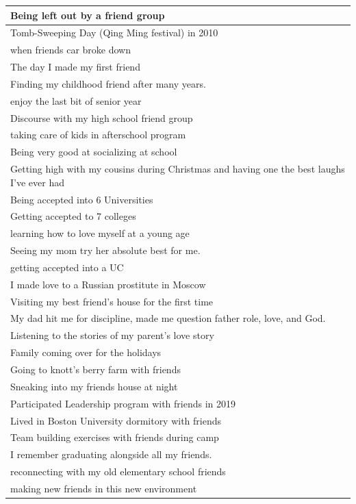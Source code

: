 \documentclass[
  .7em,
  letterpaper,
  DIV=11,
  numbers=noendperiod]{scrartcl}
\begin{document}
\begin{table}
\begin{tabular}{l}
\hline
Being left out by a friend group\\
\hline
Tomb-Sweeping Day (Qing Ming festival) in 2010\\
\hline
when friends car  broke down\\
\hline
The day I made my first friend\\
\hline
Finding my childhood friend after many years.\\
\hline
enjoy the last bit of senior year\\
\hline
Discourse with my high school friend group\\
\hline
taking care of kids in afterschool program\\
\hline
Being very good at socializing at school\\
\hline
Getting high with my cousins during Christmas and having one the best laughs I've ever had\\
\hline
Being accepted into 6 Universities\\
\hline
Getting accepted to 7 colleges\\
\hline
learning how to love myself at a young age\\
\hline
Seeing my mom try her absolute best for me.\\
\hline
getting accepted into a UC\\
\hline
I made love to a Russian prostitute in Moscow\\
\hline
Visiting my best friend's house for the first time\\
\hline
My dad hit me for discipline, made me question father role, love, and God.\\
\hline
Listening to the stories of my parent's love story\\
\hline
Family coming over for the holidays\\
\hline
Going to knott's berry farm with friends\\
\hline
Sneaking into my friends house at night\\
\hline
Participated Leadership program with friends in 2019\\
\hline
Lived in Boston University dormitory with friends\\
\hline
Team building exercises with friends during camp\\
\hline
I remember graduating alongside all my friends.\\
\hline
reconnecting with my old elementary school friends\\
\hline
making new friends in this new environment\\

\end{tabular}
\end{table}
\end{document}
